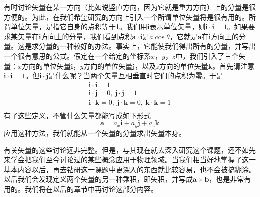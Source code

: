 有时讨论矢量在某一方向（比如说竖直方向，因为它就是重力方向）上的分量是很方便的。为此，在我们希望研究的方向上引入一个所谓单位矢量将是很有用的。所谓单位矢量，是指它自身的点积等于1。我们用$\boldsymbol{i}$表示单位矢量，则$\boldsymbol{i} \cdot \boldsymbol{i}=1$。如果要求某矢量在$\boldsymbol{i}$方向上的分量，我们看到点积$\boldsymbol{a} \cdot \boldsymbol{i}$是$a\cos\theta$，它就是$\boldsymbol{a}$在$\boldsymbol{i}$方向上的分量。这是求分量的一种较好的办法。事实上，它能使我们得出所有的分量，并写出一个很有意思的公式。假定在一个给定的坐标系$x$，$y$，$z$中，我们引入了三个矢量：$x$方向的单位矢量$\boldsymbol{i}$，$y$方向的单位矢量$\boldsymbol{j}$，以及$z$方向的单位矢量$\boldsymbol{k}$。首先请注意$\boldsymbol{i} \cdot \boldsymbol{i}=1$。但$\boldsymbol{i} \cdot \boldsymbol{j}$是什么呢？当两个矢量互相垂直时它们的点积为零。于是
\begin{equation}
    \label{Eq:I:11:24}
    \begin{split}
        \boldsymbol{i} \cdot \boldsymbol{i}=1 \\
        \boldsymbol{i} \cdot \boldsymbol{j}=0,~\boldsymbol{j} \cdot \boldsymbol{j}=1 \\
        \boldsymbol{i} \cdot \boldsymbol{k}=0,~\boldsymbol{j} \cdot \boldsymbol{k}=0,~\boldsymbol{k} \cdot \boldsymbol{k}=1 \\
    \end{split}
\end{equation}
有了这些定义，不管什么矢量都能写成如下形式
\begin{equation}
    \label{Eq:I:11:25}
    \boldsymbol{a}=a_x\boldsymbol{i}+a_y\boldsymbol{j}+a_z\boldsymbol{k}
\end{equation}
应用这种方法，我们就能从一个矢量的分量求出矢量本身。

有关矢量的这些讨论远非完整。但是，与其现在就去深入研究这个课题，还不如先来学会把我们至今讨论过的某些概念应用于物理领域。当我们相当好地掌握了这一基本内容以后，再去钻研这一课题中更深入的东西就比较容易，也不会被搞糊涂。以后我们会发现定义两个矢量的另一种乘积，即矢积，并写成$\boldsymbol{a} \times \boldsymbol{b}$，也是非常有用的。我们将在以后的章节中再讨论这部分内容。